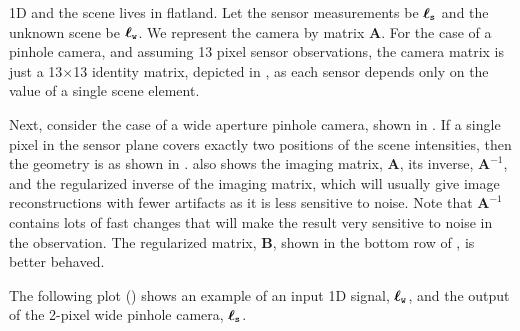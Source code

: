
1D and the scene lives in flatland.  
Let the sensor
measurements be $\boldsymbol\ell_{\texttt{s}}$ and the unknown scene be $\boldsymbol\ell_{\texttt{w}}$.  We
represent the camera by matrix $\mathbf{A}$.  For the case of a pinhole
camera, and assuming 13 pixel sensor
observations, the camera matrix is just a 13$\times$13 identity matrix, depicted in 
, as each sensor depends only on the value of a single scene element.  



Next, consider the case of a wide aperture pinhole camera, shown in
.  If a single pixel in the sensor plane covers exactly two positions of the scene intensities, then the geometry is as shown in .  also shows the imaging matrix, $\mathbf{A}$,  its inverse, $\mathbf{A}^{-1}$, and the regularized inverse of the imaging matrix, which will usually give image reconstructions with fewer artifacts as it is less sensitive to noise. Note that $\mathbf{A}^{-1}$ contains lots of fast changes that will make the result very sensitive to noise in the observation. The regularized matrix, $\mathbf{B}$, shown in the bottom row of , is better behaved.

The following plot (\fig{\ref{fig:2pixelwidepinhole}}) shows an example of an input 1D signal, $\boldsymbol\ell_{\texttt{w}}$, and the output of the 2-pixel wide pinhole camera, $\boldsymbol\ell_{\texttt{s}}$. 


